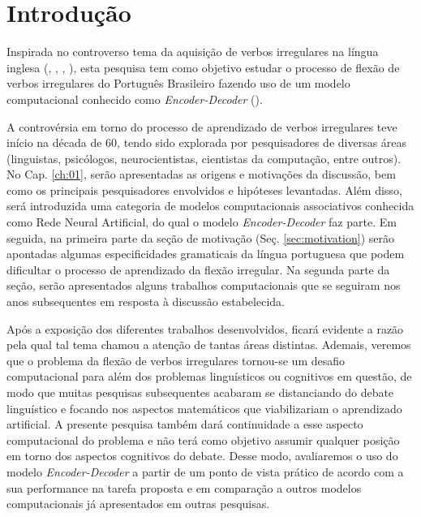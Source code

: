 \chapter*{Introdução}

Inspirada no controverso tema da aquisição de verbos irregulares na língua inglesa
(\cite{Pinker:1999}, \cite{chomsky:1968},  \cite{Pinker:1988}, \cite{rumelhart:1986}), esta pesquisa tem como objetivo estudar o processo de flexão de verbos irregulares do Português Brasileiro fazendo uso de um modelo computacional conhecido como \textit{Encoder-Decoder} (\cite{enc-dec:2014}).

A controvérsia em torno do processo de aprendizado de verbos irregulares teve início na década de 60, tendo sido explorada por pesquisadores de diversas áreas (linguistas, psicólogos, neurocientistas, cientistas da computação, entre outros). No Cap. \ref{ch:01}, serão apresentadas as origens e motivações da discussão, bem como os principais pesquisadores envolvidos e hipóteses levantadas. Além disso, será introduzida uma categoria de modelos computacionais associativos conhecida como Rede Neural Artificial, do qual o modelo \textit{Encoder-Decoder} faz parte. Em seguida, na primeira parte da seção de motivação (Seç. \ref{sec:motivation}) serão apontadas algumas especificidades gramaticais da língua portuguesa que podem dificultar o processo de aprendizado da flexão irregular. Na segunda parte da seção, serão apresentados alguns trabalhos computacionais que se seguiram nos anos subsequentes em resposta à discussão estabelecida. 

Após a exposição dos diferentes trabalhos desenvolvidos, ficará evidente a razão pela qual tal tema chamou a atenção de tantas áreas distintas. Ademais, veremos que o problema da flexão de verbos irregulares tornou-se um desafio computacional para além dos problemas linguísticos ou cognitivos em questão, de modo que muitas pesquisas subsequentes acabaram se distanciando do debate linguístico e focando nos aspectos matemáticos que viabilizariam o aprendizado artificial. A presente pesquisa também dará continuidade a esse aspecto computacional do problema e não terá como objetivo assumir qualquer posição em torno dos aspectos cognitivos do debate. Desse modo, avaliaremos o uso do modelo \textit{Encoder-Decoder} a partir de um ponto de vista prático de acordo com a sua performance na tarefa proposta e em comparação a outros modelos computacionais já apresentados em outras pesquisas.

